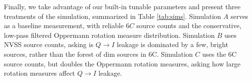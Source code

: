 Finally, we take advantage of our built-in tunable parameters and present three treatments of the
simulation, summarized in Table \ref{tab:sims}. Simulation $A$ serves as a baseline measurement,
with reliable $6C$ source counts and the conservative, low-pass filtered Oppermann rotation measure
distribution. Simulation $B$ uses NVSS source counts, asking is $Q\to I$ leakage is dominated by a
few, bright sources, rather than the forest of dim sources in 6C. Simulation $C$ uses the 6C source
counts, but doubles the Oppermann rotation measures, asking how large rotation measures affect $Q\to
I$ leakage.
